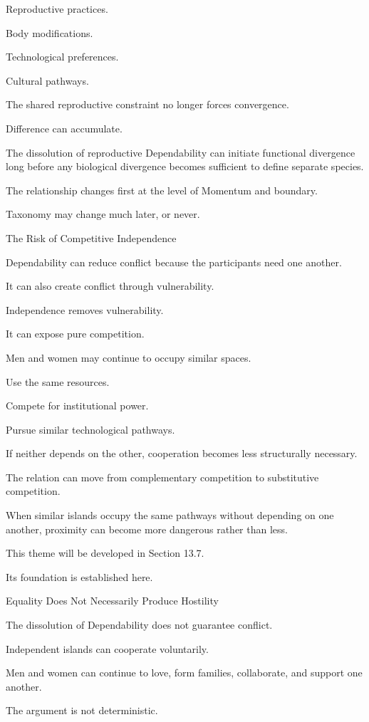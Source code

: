 Reproductive practices.

Body modifications.

Technological preferences.

Cultural pathways.

The shared reproductive constraint no longer forces convergence.

Difference can accumulate.

The dissolution of reproductive Dependability can initiate functional divergence long before any biological divergence becomes sufficient to define separate species.

The relationship changes first at the level of Momentum and boundary.

Taxonomy may change much later, or never.

The Risk of Competitive Independence

Dependability can reduce conflict because the participants need one another.

It can also create conflict through vulnerability.

Independence removes vulnerability.

It can expose pure competition.

Men and women may continue to occupy similar spaces.

Use the same resources.

Compete for institutional power.

Pursue similar technological pathways.

If neither depends on the other, cooperation becomes less structurally necessary.

The relation can move from complementary competition to substitutive competition.

When similar islands occupy the same pathways without depending on one another, proximity can become more dangerous rather than less.

This theme will be developed in Section 13.7.

Its foundation is established here.

Equality Does Not Necessarily Produce Hostility

The dissolution of Dependability does not guarantee conflict.

Independent islands can cooperate voluntarily.

Men and women can continue to love, form families, collaborate, and support one another.

The argument is not deterministic.


